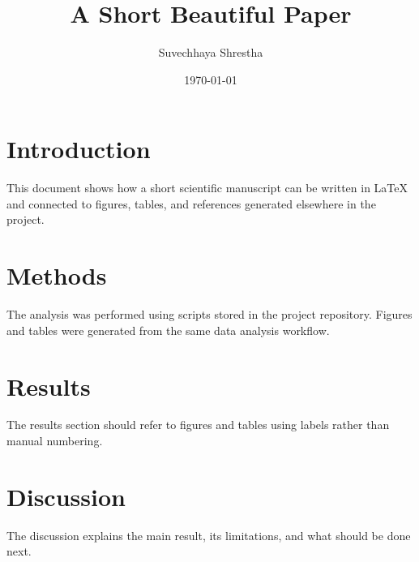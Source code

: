 \documentclass[11pt]{article}
\title{A Short Beautiful Paper}
\author{Suvechhaya Shrestha}
\date{\today}
\begin{document}
\maketitle

\section{Introduction}

This document shows how a short scientific manuscript can be written in
\LaTeX{} and connected to figures, tables, and references generated elsewhere
in the project.

\section{Methods}

The analysis was performed using scripts stored in the project repository.
Figures and tables were generated from the same data analysis workflow.

\section{Results}

The results section should refer to figures and tables using labels rather than
manual numbering.

\section{Discussion}

The discussion explains the main result, its limitations, and what should be
done next.
\end{document}
